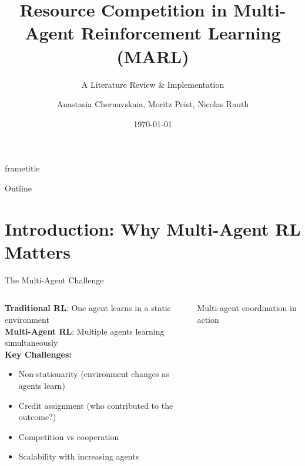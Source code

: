\documentclass[aspectratio=169]{beamer}
\title{Resource Competition in Multi-Agent Reinforcement Learning (MARL)}
\subtitle{A Literature Review \& Implementation}
\date{\today}
\author{Anastasia Chernavskaia, Moritz Peist, Nicolas Rauth}
\institute{}
\begin{document}
\begin{frame}{}
    \titlepage
\end{frame}

{
    \nointerlineskip
    \begin{beamercolorbox}[sep=0.3cm,wd=\paperwidth]{frametitle}
        \strut\insertframetitle\strut
        \hfill
        \raisebox{-0.8mm}{}
    \end{beamercolorbox}
}

\begin{frame}{Outline}
    \tableofcontents
\end{frame}

\section{Introduction: Why Multi-Agent RL Matters}

\begin{frame}{The Multi-Agent Challenge}
    
    \begin{columns}
        \begin{column}{0.45\textwidth}
            \textbf{Traditional RL}: One agent learns in a static environment \\
            \textbf{Multi-Agent RL}: Multiple agents learning simultaneously \\
            \textbf{Key Challenges:}
            \begin{itemize}
                \item Non-stationarity (environment changes as agents learn)
                \item Credit assignment (who contributed to the outcome?)
                \item Competition vs cooperation
                \item Scalability with increasing agents
            \end{itemize}
        \end{column}
        \begin{column}{0.55\textwidth}
            \centering
            \small{Multi-agent coordination in action}
        \end{column}
    \end{columns}
\end{frame}
\end{document}
